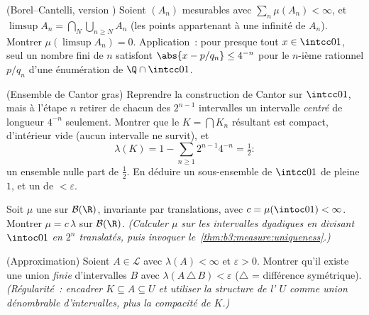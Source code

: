 \begin{exercise}[$\star\star$]\label{exo:b3:measure:4}
(Borel--Cantelli, version ) Soient $(A_n)$ mesurables
avec $\sum_n\mu(A_n) < \infty$, et $\limsup A_n =
\bigcap_N\bigcup_{n\geq N}A_n$ (les points appartenant à une
infinité de $A_n$). Montrer $\mu(\limsup A_n) = 0$.
Application~: pour presque tout $x \in \intcc01$, seul un
nombre fini de $n$ satisfont $\abs{x - p/q_n} \leq 4^{-n}$
pour le $n$-ième rationnel $p/q_n$ d'une énumération de
$\Q\cap\intcc01$.
\end{exercise}

\begin{exercise}[$\star\star$]\label{exo:b3:measure:5}
(Ensemble de Cantor gras) Reprendre la construction de
Cantor sur $\intcc01$, mais à l'étape $n$ retirer de chacun
des $2^{n-1}$ intervalles un intervalle 
\emph{centré} de longueur $4^{-n}$ seulement. Montrer que
le $K = \bigcap K_n$ résultant est compact, d'intérieur vide
(aucun intervalle ne survit), et
\[
\lambda(K) = 1 - \sum_{n\geq1}2^{n-1}4^{-n} = \tfrac12 :
\]
un ensemble nulle part  de  $\frac12$. En déduire
un sous-ensemble \emph{} de $\intcc01$ de  pleine
$1$, et un   de  $< \varepsilon$.
\end{exercise}

\begin{exercise}[$\star\star$]\label{exo:b3:measure:6}
Soit $\mu$ une  sur $\mathcal B(\R)$, invariante par
translations, avec $c = \mu(\intoc01) < \infty$. Montrer
$\mu = c\,\lambda$ sur $\mathcal B(\R)$.
\emph{(Calculer $\mu$ sur les intervalles dyadiques en
divisant $\intoc01$ en $2^n$ translatés, puis invoquer
le~\cref{thm:b3:measure:uniqueness}.)}
\end{exercise}

\begin{exercise}[$\star\star$]\label{exo:b3:measure:7}
(Approximation) Soient $A \in \mathcal L$ avec $\lambda(A) <
\infty$ et $\varepsilon > 0$. Montrer qu'il existe une union
\emph{finie} d'intervalles $B$ avec $\lambda(A\,\triangle\,B)
< \varepsilon$ ($\triangle$ = différence symétrique).
\emph{(Régularité~: encadrer $K \subseteq A \subseteq U$ et
utiliser la structure de l' $U$ comme union
dénombrable d'intervalles, plus la compacité de $K$.)}
\end{exercise}

